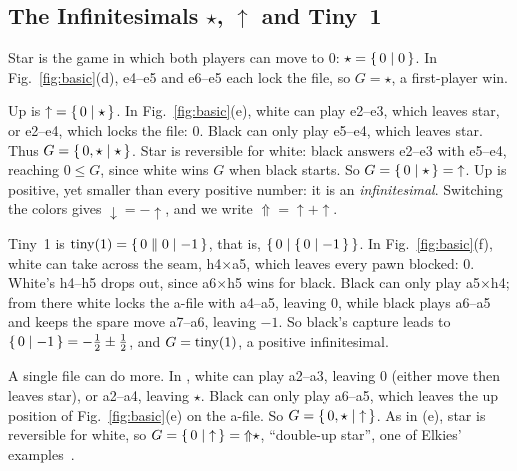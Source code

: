\subsection{The Infinitesimals \texorpdfstring{$\star$, ${\uparrow}$}{Star, Up} and Tiny~1}\label{sec:basic-inf}
Star is the game in which both players can move to $0$: $\star=\{\,0 \mid 0\,\}$. In Fig.~\ref{fig:basic}(d),
e4--e5 and e6--e5 each lock the file, so $G=\star$, a first-player win.

Up is ${\uparrow}=\{\,0 \mid \star\,\}$. In Fig.~\ref{fig:basic}(e), white can play e2--e3, which leaves star, or
e2--e4, which locks the file: $0$. Black can only play e5--e4, which leaves star. Thus
$G=\{\,0,\star \mid \star\,\}$. Star is reversible for white: black answers e2--e3 with e5--e4, reaching
$0\le G$, since white wins $G$ when black starts. So $G=\{\,0 \mid \star\,\}={\uparrow}$. Up is positive, yet
smaller than every positive number: it is an \emph{infinitesimal}. Switching the colors gives
${\downarrow}=-{\uparrow}$, and we write ${\Uparrow}={\uparrow}+{\uparrow}$.

Tiny~1 is $\operatorname{tiny}(1)=\{\,0 \parallel 0\mid -1\,\}$, that is, $\{\,0 \mid \{\,0 \mid -1\,\}\,\}$. In Fig.~\ref{fig:basic}(f), white
can take across the seam, h4$\times$a5, which leaves every pawn blocked: $0$. White's h4--h5 drops out, since
a6$\times$h5 wins for black. Black can only play a5$\times$h4; from there white locks the a-file with a4--a5,
leaving $0$, while black plays a6--a5 and keeps the spare move a7--a6, leaving $-1$. So black's capture leads
to $\{\,0 \mid -1\,\}=-\tfrac12\pm\tfrac12$, and $G=\operatorname{tiny}(1)$, a positive infinitesimal.

A single file can do more. In , white can play a2--a3, leaving $0$ (either move then leaves
star), or a2--a4, leaving $\star$. Black can only play a6--a5, which leaves the up position of
Fig.~\ref{fig:basic}(e) on the a-file. So $G=\{\,0,\star \mid {\uparrow}\,\}$. As in (e), star is reversible for
white, so $G=\{\,0 \mid {\uparrow}\,\}={\Uparrow}\star$, ``double-up star'', one of Elkies'
examples~\cite{Elkies1996}.
